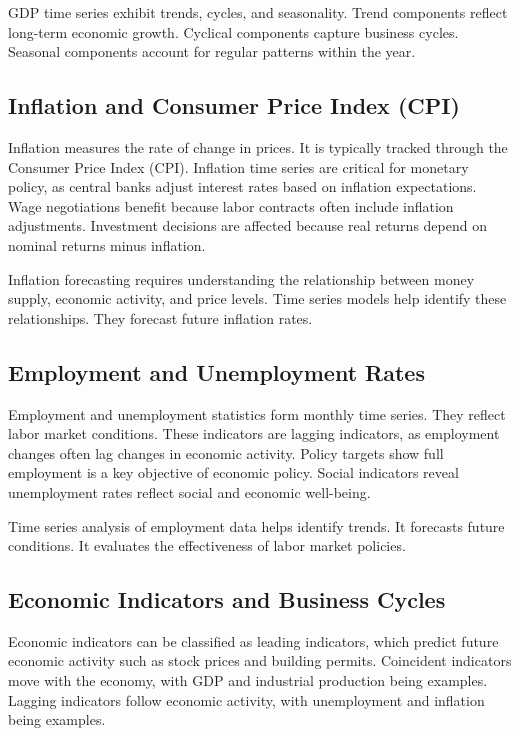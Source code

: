 GDP time series exhibit trends, cycles, and seasonality. Trend components reflect long-term economic growth. Cyclical components capture business cycles. Seasonal components account for regular patterns within the year.

\subsection{Inflation and Consumer Price Index (CPI)}

Inflation measures the rate of change in prices. It is typically tracked through the Consumer Price Index (CPI). Inflation time series are critical for monetary policy, as central banks adjust interest rates based on inflation expectations. Wage negotiations benefit because labor contracts often include inflation adjustments. Investment decisions are affected because real returns depend on nominal returns minus inflation.

Inflation forecasting requires understanding the relationship between money supply, economic activity, and price levels. Time series models help identify these relationships. They forecast future inflation rates.

\subsection{Employment and Unemployment Rates}

Employment and unemployment statistics form monthly time series. They reflect labor market conditions. These indicators are lagging indicators, as employment changes often lag changes in economic activity. Policy targets show full employment is a key objective of economic policy. Social indicators reveal unemployment rates reflect social and economic well-being.

Time series analysis of employment data helps identify trends. It forecasts future conditions. It evaluates the effectiveness of labor market policies.

\subsection{Economic Indicators and Business Cycles}

Economic indicators can be classified as leading indicators, which predict future economic activity such as stock prices and building permits. Coincident indicators move with the economy, with GDP and industrial production being examples. Lagging indicators follow economic activity, with unemployment and inflation being examples.

